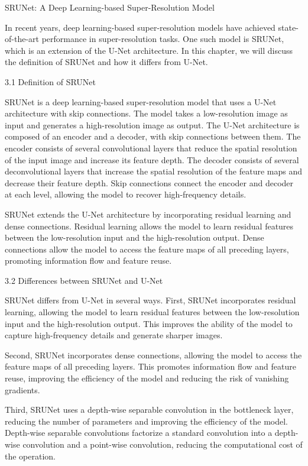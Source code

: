 \label{chap:Architectures}

SRUNet: A Deep Learning-based Super-Resolution Model

In recent years, deep learning-based super-resolution models have achieved state-of-the-art performance in super-resolution tasks. One such model is SRUNet, which is an extension of the U-Net architecture. In this chapter, we will discuss the definition of SRUNet and how it differs from U-Net.

3.1 Definition of SRUNet

SRUNet is a deep learning-based super-resolution model that uses a U-Net architecture with skip connections. The model takes a low-resolution image as input and generates a high-resolution image as output. The U-Net architecture is composed of an encoder and a decoder, with skip connections between them. The encoder consists of several convolutional layers that reduce the spatial resolution of the input image and increase its feature depth. The decoder consists of several deconvolutional layers that increase the spatial resolution of the feature maps and decrease their feature depth. Skip connections connect the encoder and decoder at each level, allowing the model to recover high-frequency details.

SRUNet extends the U-Net architecture by incorporating residual learning and dense connections. Residual learning allows the model to learn residual features between the low-resolution input and the high-resolution output. Dense connections allow the model to access the feature maps of all preceding layers, promoting information flow and feature reuse.

3.2 Differences between SRUNet and U-Net

SRUNet differs from U-Net in several ways. First, SRUNet incorporates residual learning, allowing the model to learn residual features between the low-resolution input and the high-resolution output. This improves the ability of the model to capture high-frequency details and generate sharper images.

Second, SRUNet incorporates dense connections, allowing the model to access the feature maps of all preceding layers. This promotes information flow and feature reuse, improving the efficiency of the model and reducing the risk of vanishing gradients.

Third, SRUNet uses a depth-wise separable convolution in the bottleneck layer, reducing the number of parameters and improving the efficiency of the model. Depth-wise separable convolutions factorize a standard convolution into a depth-wise convolution and a point-wise convolution, reducing the computational cost of the operation.

